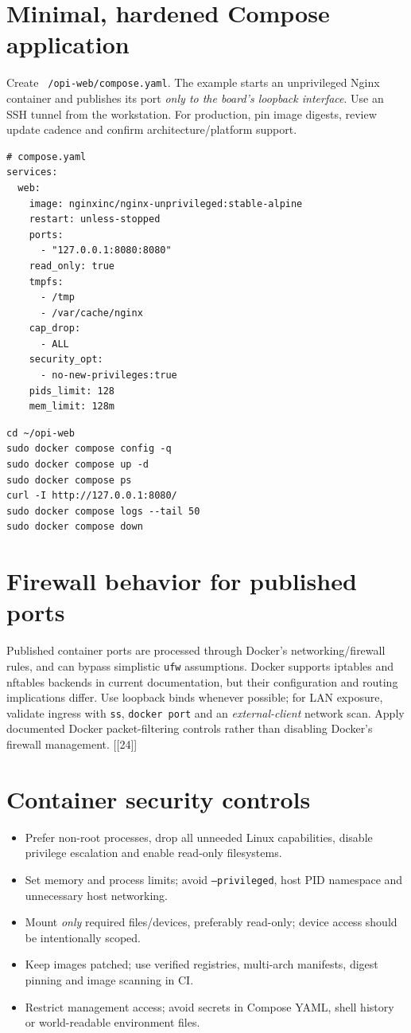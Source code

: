 \documentclass[10pt,oneside,openany]{report}
\newcommand{\code}[1]{\texttt{#1}}
\newcommand{\smallref}[1]{{\sffamily\scriptsize\color{slate}[#1]}}
\begin{document}
\section{Minimal, hardened Compose application}
Create \code{~/opi-web/compose.yaml}. The example starts an unprivileged Nginx container and publishes its port \emph{only to the board's loopback interface}. Use an SSH tunnel from the workstation. For production, pin image digests, review update cadence and confirm architecture/platform support.
\begin{lstlisting}[style=config]
# compose.yaml
services:
  web:
    image: nginxinc/nginx-unprivileged:stable-alpine
    restart: unless-stopped
    ports:
      - "127.0.0.1:8080:8080"
    read_only: true
    tmpfs:
      - /tmp
      - /var/cache/nginx
    cap_drop:
      - ALL
    security_opt:
      - no-new-privileges:true
    pids_limit: 128
    mem_limit: 128m
\end{lstlisting}
\begin{lstlisting}[style=sh]
cd ~/opi-web
sudo docker compose config -q
sudo docker compose up -d
sudo docker compose ps
curl -I http://127.0.0.1:8080/
sudo docker compose logs --tail 50
sudo docker compose down
\end{lstlisting}
\section{Firewall behavior for published ports}
Published container ports are processed through Docker's networking/firewall rules, and can bypass simplistic \code{ufw} assumptions. Docker supports iptables and nftables backends in current documentation, but their configuration and routing implications differ. Use loopback binds whenever possible; for LAN exposure, validate ingress with \code{ss}, \code{docker port} and an \emph{external-client} network scan. Apply documented Docker packet-filtering controls rather than disabling Docker's firewall management. \smallref{[24]}
\section{Container security controls}
\begin{itemize}
\item Prefer non-root processes, drop all unneeded Linux capabilities, disable privilege escalation and enable read-only filesystems.
\item Set memory and process limits; avoid \code{--privileged}, host PID namespace and unnecessary host networking.
\item Mount \emph{only} required files/devices, preferably read-only; device access should be intentionally scoped.
\item Keep images patched; use verified registries, multi-arch manifests, digest pinning and image scanning in CI.
\item Restrict management access; avoid secrets in Compose YAML, shell history or world-readable environment files.
\end{itemize}
\end{document}
